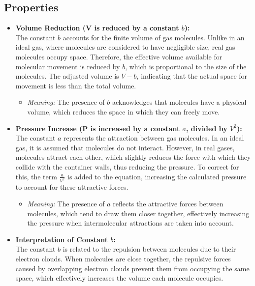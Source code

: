 \documentclass{report}
\begin{document}
\subsection{Properties}

\begin{itemize}
	\item \textbf{Volume Reduction (V is reduced by a constant \( b \)):} \\
	      The constant \( b \) accounts for the finite volume of gas molecules. Unlike in an ideal gas, where molecules are considered to have negligible size, real gas molecules occupy space. Therefore, the effective volume available for molecular movement is reduced by \( b \), which is proportional to the size of the molecules. The adjusted volume is \( V - b \), indicating that the actual space for movement is less than the total volume.

	      \begin{itemize}
		      \item \textit{Meaning:} The presence of \( b \) acknowledges that molecules have a physical volume, which reduces the space in which they can freely move.
	      \end{itemize}

	\item \textbf{Pressure Increase (P is increased by a constant \( a \), divided by \( V^2 \)):} \\
	      The constant \( a \) represents the attraction between gas molecules. In an ideal gas, it is assumed that molecules do not interact. However, in real gases, molecules attract each other, which slightly reduces the force with which they collide with the container walls, thus reducing the pressure. To correct for this, the term \( \frac{a}{V^2} \) is added to the equation, increasing the calculated pressure to account for these attractive forces.

	      \begin{itemize}
		      \item \textit{Meaning:} The presence of \( a \) reflects the attractive forces between molecules, which tend to draw them closer together, effectively increasing the pressure when intermolecular attractions are taken into account.
	      \end{itemize}

	\item \textbf{Interpretation of Constant \( b \):} \\
	      The constant \( b \) is related to the repulsion between molecules due to their electron clouds. When molecules are close together, the repulsive forces caused by overlapping electron clouds prevent them from occupying the same space, which effectively increases the volume each molecule occupies.


\end{itemize}
\end{document}
